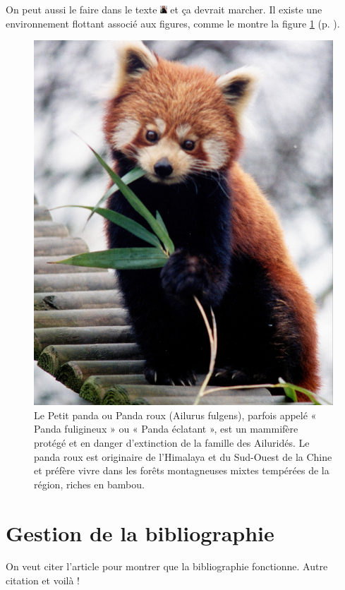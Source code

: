 \documentclass[10pt,a4paper]{article}
\begin{document}
On peut aussi le faire dans le texte \includegraphics[width=2.5mm]{figures/firefox.jpg} et ça devrait marcher. 
Il existe une environnement flottant associé aux figures, comme le montre la figure \ref{fig:panda_roux} (p. \pageref{fig:panda_roux}).

\begin{figure}[b!]
\begin{center}
\includegraphics[width=1.\textwidth]{figures/firefox.jpg} %
\end{center}
\caption{Le Petit panda ou Panda roux (Ailurus fulgens), parfois appelé « Panda fuligineux » ou « Panda éclatant », est un mammifère protégé et en danger d'extinction de la famille des Ailuridés. 
Le panda roux est originaire de l'Himalaya et du Sud-Ouest de la Chine et préfère vivre dans les forêts montagneuses mixtes tempérées de la région, riches en bambou. }
\label{fig:panda_roux}
\end{figure}

\blindtext[10]

\blindtext[10]

\section{Gestion de la bibliographie}

On veut citer l'article \cite{hawking1974black} pour montrer que la bibliographie fonctionne. Autre citation \cite{yuan2022quantum} et voilà !


%

\end{document}
